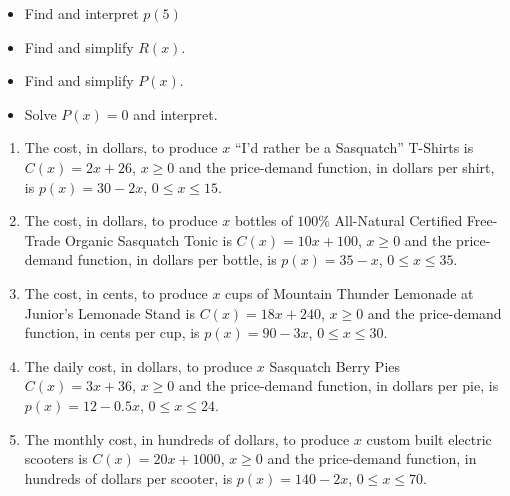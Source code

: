 \begin{multicols}{2}
\begin{itemize}

\item  Find and interpret $p(5)$
\item  Find and simplify $R(x)$.

\end{itemize}
\end{multicols}

\begin{multicols}{2}
\begin{itemize}

\item  Find and simplify $P(x)$.
\item  Solve $P(x) = 0$ and interpret.

\end{itemize}
\end{multicols}

\begin{enumerate}
\setcounter{enumi}{\value{HW}}

\item  The cost, in dollars, to produce $x$ ``I'd rather be a Sasquatch'' T-Shirts is $C(x) = 2x+26$, $x \geq 0$ and the price-demand function, in dollars per shirt,  is $p(x) = 30 - 2x$, $0 \leq x \leq 15$. \label{econexerfirst}

\item  The cost, in dollars, to produce $x$ bottles of $100 \%$ All-Natural Certified Free-Trade Organic Sasquatch Tonic is $C(x) = 10x+100$, $x \geq 0$ and the price-demand function, in dollars per bottle,  is $p(x) = 35 - x$, $0 \leq x \leq 35$.


\item  The cost, in cents, to produce $x$ cups of Mountain Thunder Lemonade at Junior's Lemonade Stand  is $C(x) = 18x + 240$, $x \geq 0$ and the price-demand function, in cents per cup,  is $p(x) = 90-3x$, $0 \leq x \leq 30$.


\item  The daily cost, in dollars, to produce $x$ Sasquatch Berry Pies $C(x) = 3x + 36$, $x \geq 0$ and the price-demand function, in  dollars per pie,  is $p(x) = 12-0.5x$, $0 \leq x \leq 24$.

\item  The monthly cost, in hundreds of dollars, to produce $x$ custom built electric scooters is $C(x) = 20x + 1000$, $x \geq 0$ and the price-demand function, in  hundreds of dollars per scooter,  is $p(x) = 140-2x$, $0 \leq x \leq 70$. \label{econexerlast}

\setcounter{HW}{\value{enumi}}
\end{enumerate}

